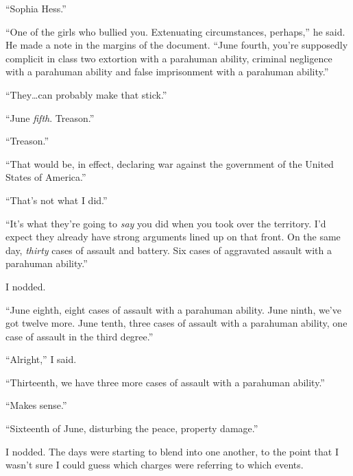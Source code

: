 ``Sophia Hess.''



``One of the girls who bullied you.  Extenuating circumstances, perhaps,'' he said.  He made a note in the margins of the document.  ``June fourth, you're supposedly complicit in class two extortion with a parahuman ability, criminal negligence with a parahuman ability and false imprisonment with a parahuman ability.''



``They\ldots can probably make that stick.''



``June \emph{fifth}.  Treason.''



``Treason.''



``That would be, in effect, declaring war against the government of the United States of America.''



``That's not what I did.''



``It's what they're going to \emph{say} you did when you took over the territory.  I'd expect they already have strong arguments lined up on that front.  On the same day, \emph{thirty} cases of assault and battery.  Six cases of aggravated assault with a parahuman ability.''



I nodded.



``June eighth, eight cases of assault with a parahuman ability.  June ninth, we've got twelve more.  June tenth, three cases of assault with a parahuman ability, one case of assault in the third degree.''



``Alright,'' I said.



``Thirteenth, we have three more cases of assault with a parahuman ability.''



``Makes sense.''



``Sixteenth of June, disturbing the peace, property damage.''



I nodded.  The days were starting to blend into one another, to the point that I wasn't sure I could guess which charges were referring to which events.



